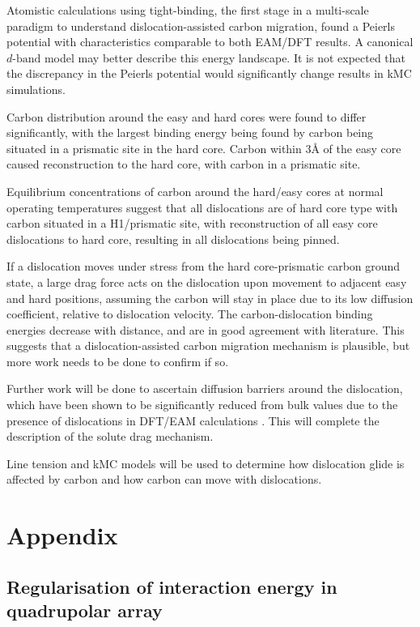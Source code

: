 \documentclass[a4paper,11pt]{article}
\begin{document}
Atomistic calculations using tight-binding, the first stage in a multi-scale paradigm to
understand dislocation-assisted carbon migration, found a Peierls potential with characteristics
comparable to both EAM/DFT results. A canonical \(d\text{-band}\) model may better describe this
energy landscape. It is not expected that the discrepancy in the Peierls potential would
significantly change results in kMC simulations.

Carbon distribution around the easy and hard cores were found to differ
significantly, with the largest binding energy being found by carbon being situated in a prismatic
site in the hard core. Carbon within 3\AA{} of the easy core caused reconstruction to the hard core,
with carbon in a prismatic site.

Equilibrium concentrations of carbon around the hard/easy cores at normal operating temperatures
suggest that all dislocations are of hard core type with carbon situated in a H1/prismatic site, with
reconstruction of all easy core dislocations to hard core, resulting in all dislocations being
pinned.

If a dislocation moves under stress from the hard core-prismatic carbon ground state, a large drag
force acts on the dislocation upon movement to adjacent easy and hard positions, assuming the carbon
will stay in place due to its low diffusion coefficient, relative to dislocation velocity. The
carbon-dislocation binding energies decrease with distance, and are in good agreement with
literature. This suggests that a dislocation-assisted carbon migration mechanism is plausible, but
more work needs to be done to confirm if so.

Further work will be done to ascertain diffusion barriers around the dislocation, which have been
shown to be significantly reduced from bulk values due to the presence of dislocations in DFT/EAM
calculations \cite{Nematollahi2016}. This will complete the description of the solute drag mechanism.

Line tension and kMC models will be used to determine how dislocation glide is affected by carbon
and how carbon can move with dislocations. 


\section{Appendix}
\label{sec:orge202120}
\subsection{Regularisation of interaction energy in quadrupolar array}
\label{sec:orgdb89227}
\label{sec:Ainteractionenergy}
\end{document}
